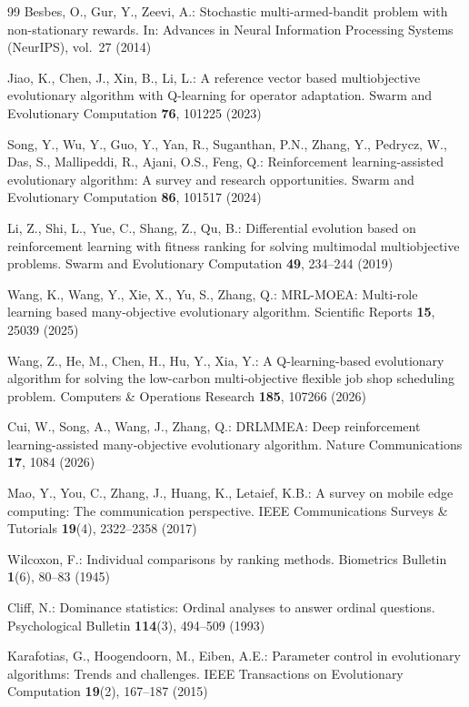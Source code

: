 \documentclass[preprint,12pt]{elsarticle}
\begin{document}
\begin{thebibliography}{99}
Besbes, O., Gur, Y., Zeevi, A.: Stochastic multi-armed-bandit problem with non-stationary rewards. In: Advances in Neural Information Processing Systems (NeurIPS), vol.~27 (2014)

Jiao, K., Chen, J., Xin, B., Li, L.: A reference vector based multiobjective evolutionary algorithm with Q-learning for operator adaptation. Swarm and Evolutionary Computation \textbf{76}, 101225 (2023)

Song, Y., Wu, Y., Guo, Y., Yan, R., Suganthan, P.N., Zhang, Y., Pedrycz, W., Das, S., Mallipeddi, R., Ajani, O.S., Feng, Q.: Reinforcement learning-assisted evolutionary algorithm: A survey and research opportunities. Swarm and Evolutionary Computation \textbf{86}, 101517 (2024)

Li, Z., Shi, L., Yue, C., Shang, Z., Qu, B.: Differential evolution based on reinforcement learning with fitness ranking for solving multimodal multiobjective problems. Swarm and Evolutionary Computation \textbf{49}, 234--244 (2019)

Wang, K., Wang, Y., Xie, X., Yu, S., Zhang, Q.: MRL-MOEA: Multi-role learning based many-objective evolutionary algorithm. Scientific Reports \textbf{15}, 25039 (2025)

Wang, Z., He, M., Chen, H., Hu, Y., Xia, Y.: A Q-learning-based evolutionary algorithm for solving the low-carbon multi-objective flexible job shop scheduling problem. Computers \& Operations Research \textbf{185}, 107266 (2026)

Cui, W., Song, A., Wang, J., Zhang, Q.: DRLMMEA: Deep reinforcement learning-assisted many-objective evolutionary algorithm. Nature Communications \textbf{17}, 1084 (2026)

Mao, Y., You, C., Zhang, J., Huang, K., Letaief, K.B.: A survey on mobile edge computing: The communication perspective. IEEE Communications Surveys \& Tutorials \textbf{19}(4), 2322--2358 (2017)

Wilcoxon, F.: Individual comparisons by ranking methods. Biometrics Bulletin \textbf{1}(6), 80--83 (1945)

Cliff, N.: Dominance statistics: Ordinal analyses to answer ordinal questions. Psychological Bulletin \textbf{114}(3), 494--509 (1993)

Karafotias, G., Hoogendoorn, M., Eiben, A.E.: Parameter control in evolutionary algorithms: Trends and challenges. IEEE Transactions on Evolutionary Computation \textbf{19}(2), 167--187 (2015)


\end{thebibliography}
\end{document}

